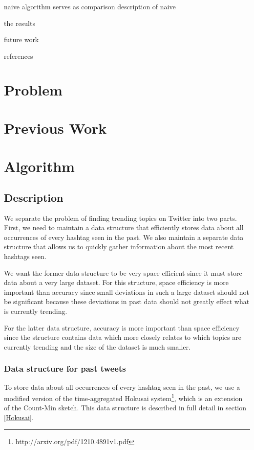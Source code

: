 \documentclass[a4paper,12pt]{article}
\begin{document}
naive algorithm serves as comparison
description of naive

the results

future work

references



\section{Problem}

\section{Previous Work}

\section{Algorithm}

\subsection{Description}

We separate the problem of finding trending topics on Twitter into two parts.  First, we need to maintain a data structure that efficiently stores data about all occurrences of every hashtag seen in the past.  We also maintain a separate data structure that allows us to quickly gather information about the most recent hashtags seen.

We want the former data structure to be very space efficient since it must store data about a very large dataset.  For this structure, space efficiency is more important than accuracy since small deviations in such a large dataset should not be significant because these deviations in past data should not greatly effect what is currently trending.

For the latter data structure, accuracy is more important than space efficiency since the structure contains data which more closely relates to which topics are currently trending and the size of the dataset is much smaller.

\subsubsection{Data structure for past tweets}

To store data about all occurrences of every hashtag seen in the past, we use a modified version of the time-aggregated Hokusai system\footnote{http://arxiv.org/pdf/1210.4891v1.pdf}, which is an extension of the Count-Min sketch.  This data structure is described in full detail in section \ref{Hokusai}.
\end{document}
